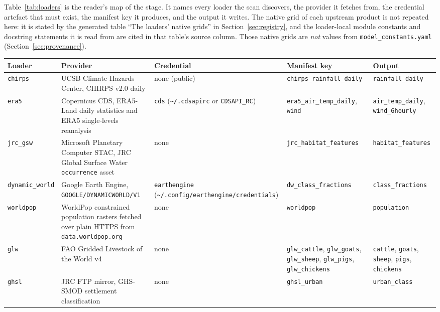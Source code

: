 \documentclass[11pt,a4paper]{article}
\newcommand{\code}[1]{\texttt{#1}}
\begin{document}
Table~\ref{tab:loaders} is the reader's map of the stage. It names every
loader the scan discovers, the provider it fetches from, the credential
artefact that must exist, the manifest key it produces, and the output it
writes. The native grid of each upstream product is not repeated here: it is
stated by the generated table ``The loaders' native grids'' in
Section~\ref{sec:registry}, and the loader-local module constants and
docstring statements it is read from are cited in that table's source column.
Those native grids are \emph{not} values from \code{model\_constants.yaml}
(Section~\ref{sec:provenance}).

\footnotesize
\begin{longtable}{@{}p{1.9cm}p{3.4cm}p{2.9cm}p{3.3cm}p{2.7cm}@{}}
\toprule
Loader & Provider & Credential & Manifest key & Output \\
\midrule
\endhead
\code{chirps} & UCSB Climate Hazards Center, CHIRPS v2.0 daily &
none (public) & \code{chirps\allowbreak\_rainfall\allowbreak\_daily} &
\code{rainfall\allowbreak\_daily} \\
\code{era5} & Copernicus CDS, ERA5-Land daily statistics and
ERA5 single-levels reanalysis & \code{cds} (\code{\textasciitilde/.cdsapirc}
or \code{CDSAPI\_RC}) &
\code{era5\allowbreak\_air\allowbreak\_temp\allowbreak\_daily},
\code{wind} & \code{air\allowbreak\_temp\allowbreak\_daily},
\code{wind\_6hourly} \\
\code{jrc\_gsw} & Microsoft Planetary Computer STAC, JRC Global Surface
Water \code{occurrence} asset & none &
\code{jrc\allowbreak\_habitat\allowbreak\_features} &
\code{habitat\allowbreak\_features} \\
\code{dynamic\_world} & Google Earth Engine, \code{GOOGLE/DYNAMICWORLD/V1}
& \code{earthengine}
(\code{\textasciitilde/.config/\allowbreak earthengine/\allowbreak credentials}) &
\code{dw\allowbreak\_class\allowbreak\_fractions} &
\code{class\allowbreak\_fractions} \\
\code{worldpop} & WorldPop constrained population rasters fetched over plain
HTTPS from \code{data.worldpop.org} & none & \code{worldpop} &
\code{population} \\
\code{glw} & FAO Gridded Livestock of the World v4 & none &
\code{glw\_cattle}, \code{glw\_goats}, \code{glw\_sheep}, \code{glw\_pigs},
\code{glw\_chickens} & \code{cattle}, \code{goats}, \code{sheep}, \code{pigs},
\code{chickens} \\
\code{ghsl} & JRC FTP mirror, GHS-SMOD settlement classification & none &
\code{ghsl\_urban} & \code{urban\allowbreak\_class} \\

\end{longtable}
\end{document}
